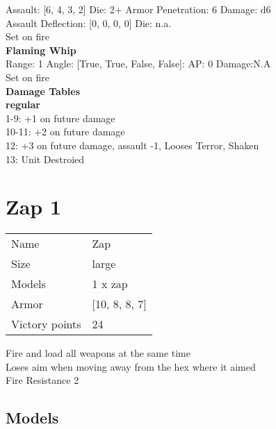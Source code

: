 Assault: [6, 4, 3, 2] Die: 2+ Armor Penetration: 6 Damage: d6 \\
Assault Deflection: [0, 0, 0, 0] Die: n.a.\\
\indent Set on fire\\ 
 



{\bf Flaming Whip } \\



Range: 1  Angle: [True, True, False, False]: AP: 0 Damage:N.A \\
Set on fire\\ 




 





{\bf Damage Tables} \\
 {\bf regular } \\
1-9: +1 on future damage \\
10-11: +2 on future damage \\
12: +3 on future damage, assault -1, Looses Terror, Shaken \\
13: Unit Destroied \\










\pagebreak\pagebreak

\section{ Zap 1 }

\begin{tabular}{ll}
  Name & Zap \\
  Size & large\\
  Models & 1 x zap\\
  Armor & [10, 8, 8, 7]\\
  Victory points & 24\\
\end{tabular}

Fire and load all weapons at the same time\\ 
Loses aim when moving away from the hex where it aimed\\ 
Fire Resistance 2\\ 


\subsection{ Models }

